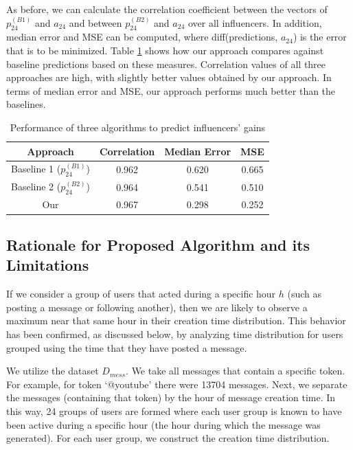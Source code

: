 As before, we can calculate the correlation coefficient between the vectors of $p_{24}^{(B1)}$ and $a_{24}$ and between $p_{24}^{(B2)}$ and $a_{24}$ over all influencers. In addition, median error and MSE can be computed, where diff(predictions, $a_{24}$) is the error that is to be minimized. Table \ref{table_24HEval} shows how our approach  compares against baseline predictions based on these measures. 
Correlation values of all three approaches are high, with slightly better values obtained by our approach.
In terms of median error and MSE,
 our approach performs much better than the baselines.
\begin{table}[htbp]
\small
\caption{Performance of three algorithms to predict influencers' gains}
\label{table_24HEval}
\centering
\begin{tabular}{|c|c|c|c|}
\hline
\bfseries Approach & \bfseries Correlation & \bfseries Median Error & \bfseries MSE\\
\hline
Baseline 1 ($p_{24}^{(B1)}$)  & 0.962 & 0.620 & 0.665\\
\hline
Baseline 2 ($p_{24}^{(B2)}$)   & 0.964 & 0.541 & 0.510\\
\hline
Our  & 0.967 & 0.298 & 0.252\\
\hline
\end{tabular}
\end{table}

\subsection{Rationale for Proposed Algorithm and its Limitations} %
If we consider a group of users that %
acted during a specific hour $h$ (such as posting a message or following another), then we are likely to observe a maximum near that same hour in their creation time distribution. This behavior has been confirmed, as discussed below, by analyzing time distribution for users grouped using the time that they have posted a message.

We utilize the dataset  $D_{mess}$. We take all messages that contain a specific token. For example, for token `@youtube' there were 13704 messages. Next, we separate the messages (containing that token) by the hour of message creation time. In this way, 24 groups of users are formed where each user group is known to have been active during a specific hour (the hour during which the message was generated). For each user group, we construct the creation time distribution. 

